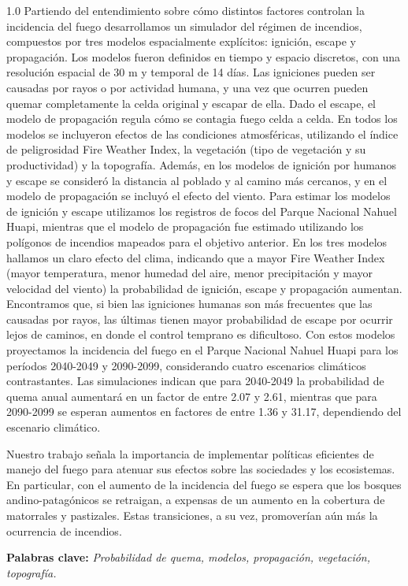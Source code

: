 \begin{spacing}{1.0}
Partiendo del entendimiento sobre cómo distintos factores controlan la incidencia del fuego desarrollamos un simulador del régimen de incendios, compuestos por tres modelos espacialmente explícitos: ignición, escape y propagación. Los modelos fueron definidos en tiempo y espacio discretos, con una resolución espacial de 30 m y temporal de 14 días. Las igniciones pueden ser causadas por rayos o por actividad humana, y una vez que ocurren pueden quemar completamente la celda original y escapar de ella. Dado el escape, el modelo de propagación regula cómo se contagia fuego celda a celda. En todos los modelos se incluyeron efectos de las condiciones atmosféricas, utilizando el índice de peligrosidad Fire Weather Index, la vegetación (tipo de vegetación y su productividad) y la topografía. Además, en los modelos de ignición por humanos y escape se consideró la distancia al poblado y al camino más cercanos, y en el modelo de propagación se incluyó el efecto del viento. Para estimar los modelos de ignición y escape utilizamos los registros de focos del Parque Nacional Nahuel Huapi, mientras que el modelo de propagación fue estimado utilizando los polígonos de incendios mapeados para el objetivo anterior. En los tres modelos hallamos un claro efecto del clima, indicando que a mayor Fire Weather Index (mayor temperatura, menor humedad del aire, menor precipitación y mayor velocidad del viento) la probabilidad de ignición, escape y propagación aumentan. Encontramos que, si bien las igniciones humanas son más frecuentes que las causadas por rayos, las últimas tienen mayor probabilidad de escape por ocurrir lejos de caminos, en donde el control temprano es dificultoso. Con estos modelos proyectamos la incidencia del fuego en el Parque Nacional Nahuel Huapi para los períodos 2040-2049 y 2090-2099, considerando cuatro escenarios climáticos contrastantes. Las simulaciones indican que para 2040-2049 la probabilidad de quema anual aumentará en un factor de entre 2.07 y 2.61, mientras que para 2090-2099 se esperan aumentos en factores de entre 1.36 y 31.17, dependiendo del escenario climático.

Nuestro trabajo señala la importancia de implementar políticas eficientes de manejo del fuego para atenuar sus efectos sobre las sociedades y los ecosistemas. En particular, con el aumento de la incidencia del fuego se espera que los bosques andino-patagónicos se retraigan, a expensas de un aumento en la cobertura de matorrales y pastizales. Estas transiciones, a su vez, promoverían aún más la ocurrencia de incendios. 

\noindent \textbf{Palabras clave:}  \textit{Probabilidad de quema, modelos, propagación, vegetación, topografía.}


\end{spacing}